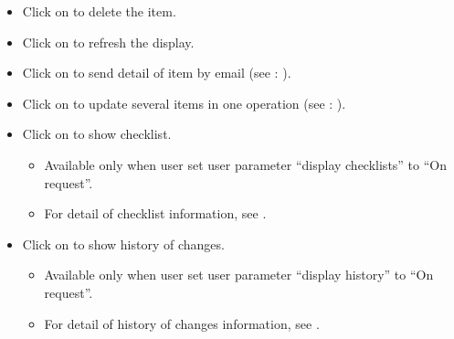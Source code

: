 \documentclass[letterpaper,10pt,english]{sphinxmanual}
\begin{document}
\begin{itemize}
\item {} 
Click on  to delete the item.

\item {} 
Click on  to refresh the display.

\item {} 
Click on  to send detail of item by email (see : {\hyperref[Gui:gui-email-detail-label]{\emph{}}}).

\item {} 
Click on  to update several items in one operation (see : {\hyperref[Gui:gui-multiple-update-label]{\emph{}}}).

\item {} 
Click on  to show checklist.
\begin{itemize}
\item {} 
Available only when user set user parameter ``display checklists'' to ``On request''.

\item {} 
For detail of checklist information, see {\hyperref[Gui:gui-checklist-section-label]{\emph{}}}.

\end{itemize}

\item {} 
Click on  to show history of changes.
\begin{itemize}
\item {} 
Available only when user set user parameter ``display history'' to ``On request''.

\item {} 
For detail of history of changes information, see {\hyperref[Gui:gui-chg-history-section-label]{\emph{}}}.

\end{itemize}

\end{itemize}
\end{document}
